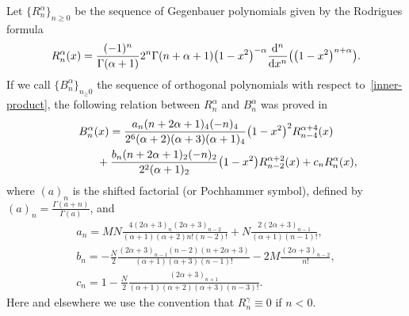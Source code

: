 \documentclass[pdftex]{sigma}
\numberwithin{equation}{section}
\begin{document}
Let $\{R_n^{\alpha}\}_{n\ge 0}$ be the sequence of Gegenbauer polynomials given by the Rodrigues formula
\begin{gather*}
R_n^{\alpha}(x)=\frac{(-1)^n}{\Gamma(\alpha+1)}{2^n\Gamma(n+\alpha+1)}\big(1-x^2\big)^{-\alpha} \frac{{\rm d}^n}{{\rm d}x^n}\big(\big(1-x^2\big)^{n+\alpha}\big).
\end{gather*}
If we call $\{B_n^{\alpha}\}_{n_\ge 0}$ the sequence of orthogonal polynomials with respect to~\eqref{inner-product}, the following relation between $R_n^{\alpha}$ and $B_n^{\alpha}$ was proved in \cite{bavinck}
\begin{gather}
B_n^{\alpha}(x)=\frac{a_n(n+2\alpha+1)_4(-n)_4}{2^6(\alpha+2)(\alpha+3)(\alpha+1)_4}\big(1-x^2\big)^2R_{n-4}^{\alpha+4}(x)\nonumber\\
\hphantom{B_n^{\alpha}(x)=}{} +\frac{b_n(n+2\alpha+1)_2(-n)_2}{2^2(\alpha+1)_2}\big(1-x^2\big)R_{n-2}^{\alpha+2}(x)+c_nR_n^{\alpha}(x),\label{rel-ortogonal}
\end{gather}
where $(a)_n$ is the shifted factorial (or Pochhammer symbol), defined by $(a)_n=\frac{\Gamma(a+n)}{\Gamma(a)}$, and
\begin{gather*}
a_n=MN\frac{4(2\alpha+3)_n(2\alpha+3)_{n-2}}{(\alpha+1)(\alpha+2)n!(n-2)!}+N\frac{2(2\alpha+3)_{n-1}}{(\alpha+1)(n-1)!},\\
b_n =-\frac{N}{2}\frac{(2\alpha+3)_{n-1}(n-2)(n+2\alpha+3)}{(\alpha+1)(\alpha+3)(n-1)!}-2M\frac{(2\alpha+3)_{n-2}}{n!},\\
c_n=1-\frac{N}{2}\frac{(2\alpha+3)_{n+1}}{(\alpha+1)(\alpha+2)(\alpha+3)(n-3)!}.
\end{gather*}
Here and elsewhere we use the convention that $R_n^{\gamma}\equiv 0$ if $n<0$.
\end{document}

